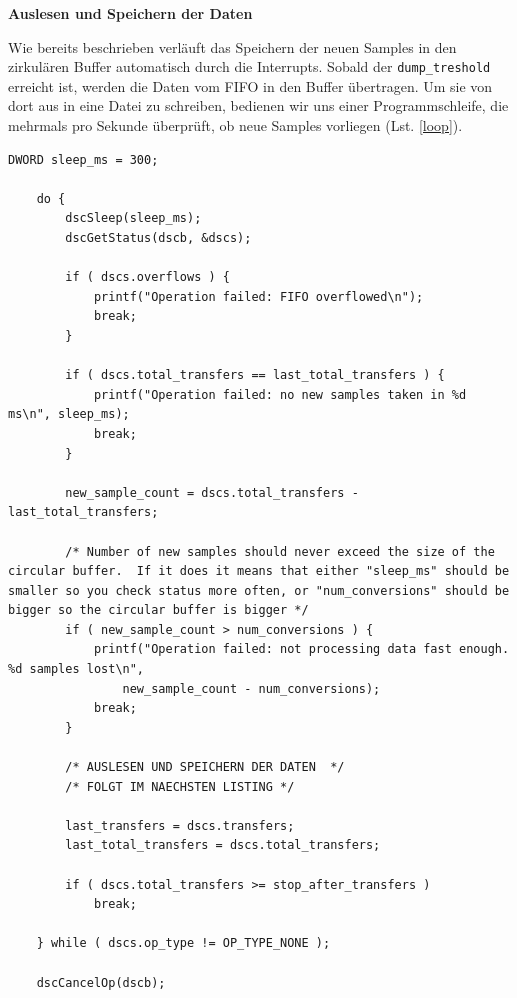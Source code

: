 \documentclass[12pt,a4paper]{scrartcl}
\begin{document}
\textbf{Auslesen und Speichern der Daten}


Wie bereits beschrieben verläuft das Speichern der neuen Samples in den zirkulären Buffer automatisch durch die Interrupts. Sobald der \texttt{dump\_treshold} erreicht ist, werden die Daten vom FIFO in den Buffer übertragen. Um sie von dort aus in eine Datei zu schreiben, bedienen wir uns einer Programmschleife, die mehrmals pro Sekunde überprüft, ob neue Samples vorliegen (Lst. \ref{loop}). 

\begin{lstlisting}[frame=trBL]
	DWORD sleep_ms = 300;
	
	do {
        dscSleep(sleep_ms);
        dscGetStatus(dscb, &dscs);

        if ( dscs.overflows ) {
            printf("Operation failed: FIFO overflowed\n");
            break;
        }

        if ( dscs.total_transfers == last_total_transfers ) {
            printf("Operation failed: no new samples taken in %d ms\n", sleep_ms);
            break;
        }

        new_sample_count = dscs.total_transfers - last_total_transfers;

        /* Number of new samples should never exceed the size of the circular buffer.  If it does it means that either "sleep_ms" should be smaller so you check status more often, or "num_conversions" should be bigger so the circular buffer is bigger */
        if ( new_sample_count > num_conversions ) {
            printf("Operation failed: not processing data fast enough.  %d samples lost\n",
                new_sample_count - num_conversions);
            break;
        }

		/* AUSLESEN UND SPEICHERN DER DATEN  */
		/* FOLGT IM NAECHSTEN LISTING */
       
        last_transfers = dscs.transfers;
        last_total_transfers = dscs.total_transfers;

        if ( dscs.total_transfers >= stop_after_transfers )
            break;

    } while ( dscs.op_type != OP_TYPE_NONE );

    dscCancelOp(dscb);
\end{lstlisting}	
\end{document}
